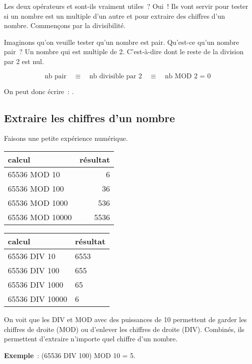 			Les deux opérateurs  et 
			sont-ils vraiment utiles~?
			Oui~! Ils vont servir pour tester si un nombre
			est un multiple d’un autre et pour extraire
			des chiffres d’un nombre.
			Commençons par la divisibilité.

			Imaginons qu’on veuille tester qu’un nombre est pair.
			Qu’est-ce qu’un nombre pair~? Un nombre qui est multiple de 2.
			C’est-à-dire dont le reste de la division par 2 est nul.
			
			\[
			\textrm{nb pair} 
				\quad\equiv\quad \textrm{nb divisible par 2} 
				\quad\equiv\quad \textrm{nb MOD 2 = 0} 
			\]
			
			On peut donc écrire~: .

		\subsection{Extraire les chiffres d’un nombre}
		
			Faisons une petite expérience numérique.
			\begin{center}
			\begin{tabular}{|l|r|}\hline
				calcul & résultat \\\hline
				\hline
				65536 MOD 10 & 6 \\  
				65536 MOD 100 & 36 \\  
				65536 MOD 1000 & 536 \\  
				65536 MOD 10000 & 5536 \\ 
				\hline 
			\end{tabular}
			\qquad
			\begin{tabular}{|l|l|}\hline
				calcul & résultat \\\hline
				\hline
				65536 DIV 10 & 6553 \\  
				65536 DIV 100 & 655 \\  
				65536 DIV 1000 & 65 \\  
				65536 DIV 10000 & 6 \\ 
				\hline 
			\end{tabular}
			\end{center}
		
			On voit que les DIV et MOD avec des puissances de 10
			permettent de garder les chiffres de droite (MOD)
			ou d’enlever les chiffres de droite (DIV).
			Combinés, ils permettent d’extraire n’importe quel
			chiffre d’un nombre.
			
			\textbf{Exemple}~: (65536 DIV 100) MOD 10 = 5.

